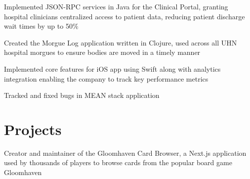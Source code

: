 \documentclass[]{resume}
\begin{document}
\begin{minipage}[t]{0.65\textwidth}
\separatorS
\begin{tightemize}
\item Implemented JSON-RPC services in Java for the Clinical Portal, granting hospital clinicians centralized access to patient data, reducing patient discharge wait times by up to 50\%
\item Created the Morgue Log application written in Clojure, used across all UHN hospital morgues to ensure bodies are moved in a timely manner
\end{tightemize}
\separatorM

\separatorS
\begin{tightemize}
\item Implemented core features for iOS app using Swift along with analytics integration enabling the company to track key performance metrics
\item Tracked and fixed bugs in MEAN stack application
\end{tightemize}
 

\section{Projects}
\separatorS
\begin{tightemize}
\item Creator and maintainer of the Gloomhaven Card Browser, a Next.js application used by thousands of players to browse cards from the popular board game Gloomhaven
\end{tightemize}
 
\end{minipage} 
\hfill
\end{document}
